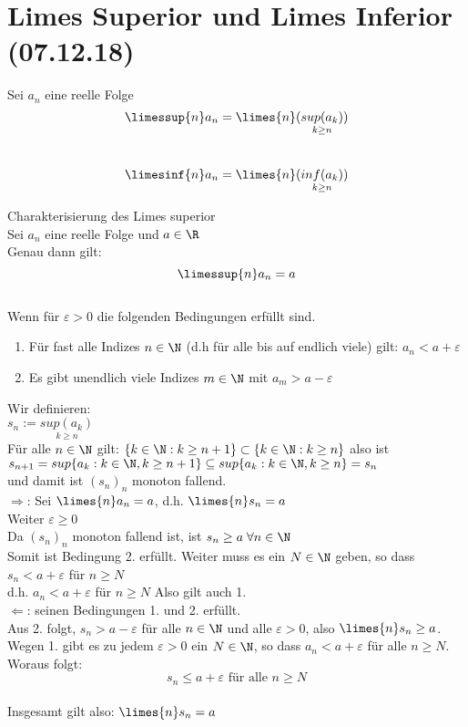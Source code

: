 \documentclass[12pt,a4paper,titlepage,draft]{article}
\begin{document}
	\section{Limes Superior und Limes Inferior (07.12.18)}
	\begin{defi}
		Sei \(a_n\) eine reelle Folge\\
		\[\limessup{n} a_n = \limes{n} (\underset{k \geq n}{sup(a_k)}) \]\\
		\[\limesinf{n} a_n = \limes{n} (\underset{k \geq n}{inf(a_k)}) \]
	\end{defi}
	\begin{satz}
		Charakterisierung des Limes superior\\
		Sei \(a_n\) eine reelle Folge und \(a \in \R\)\\
		Genau dann gilt:\\
		\[\limessup{n} a_n = a\]\\
		Wenn für \(\varepsilon > 0\) die folgenden Bedingungen erfüllt sind.\\
		\begin{enumerate}
			\item Für fast alle Indizes \(n \in \N\) (d.h für alle bis auf endlich viele) gilt: \(a_n < a+ \varepsilon\)
			\item Es gibt unendlich viele Indizes \(m \in \N\) mit \(a_m > a - \varepsilon\)
		\end{enumerate}
	\end{satz}
	\begin{bew}
		Wir definieren:\\
		\(s_n := \underset{k \geq n}{sup(a_k)}\)\\
		Für alle \(n \in \N\) gilt: \(\{k \in \N: k \geq n+1\} \subset \{k \in \N: k \geq n\}\) also ist\\
		\(s_{n+1} = sup\{a_k: k \in \N, k \geq n+1\} \subseteq sup\{a_k: k \in \N, k \geq n\} = s_n\)\\
		und damit ist \((s_n)_n\) monoton fallend.\\
		\(\Rightarrow\): Sei \(\limes{n} a_n = a\), d.h. \(\limes{n} s_n = a\)\\
		Weiter \(\varepsilon \geq 0\)\\
		Da \((s_n)_n\) monoton fallend ist, ist \(s_n \geq a \; \forall n \in \N\)\\
		Somit ist Bedingung 2. erfüllt. Weiter muss es ein \(N \in \N\) geben, so dass \(s_n < a + \varepsilon\) für \(n \geq N\)\\
		d.h. \(a_n < a + \varepsilon\) für \(n \geq N\) Also gilt auch 1.\\
		\(\Leftarrow\): seinen Bedingungen 1. und 2. erfüllt.\\
		Aus 2. folgt, \(s_n > a - \varepsilon\) für alle \(n \in \N\) und alle \(\varepsilon > 0\), also \(\limes{n} s_n \geq a\).\\
		Wegen 1. gibt es zu jedem \(\varepsilon > 0\) ein \(N \in \N\), so dass \(a_n < a + \varepsilon\) für alle \(n \geq N\).\\
		Woraus folgt:\\
		\[s_n \leq a + \varepsilon \text{ für alle } n \geq N\]\\
		Insgesamt gilt also: \(\limes{n} s_n = a\)\\
	\end{bew}
\end{document}
